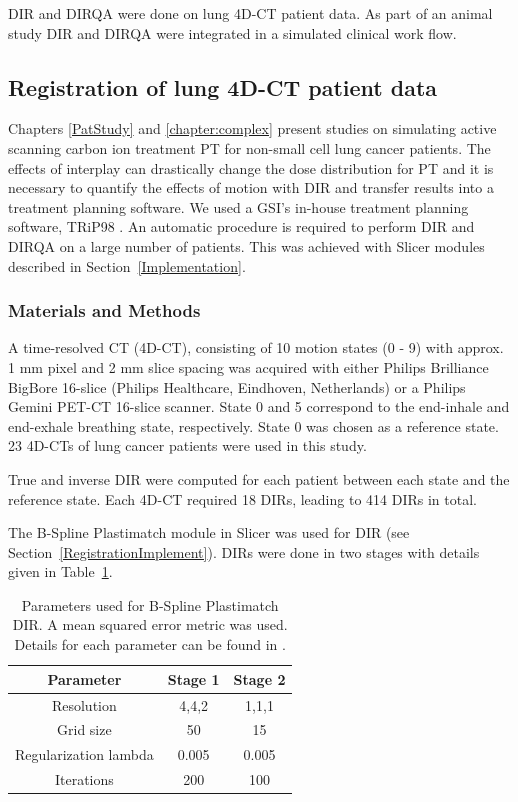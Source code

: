 \documentclass[type=dr, dr=rernat, accentcolor=tud7b,colorbacktitle, bigchapter, openright, twoside, 12pt ]{tudthesis}
\begin{document}
DIR and DIRQA were done on lung 4D-CT patient data. As part of an animal study \cite{Lehmann2015} DIR and DIRQA were integrated in a simulated clinical work flow. 

\subsection{Registration of lung 4D-CT patient data}
\label{lungDIR}

Chapters \ref{PatStudy} and \ref{chapter:complex} present studies on simulating active scanning carbon ion treatment PT for non-small cell lung cancer patients. The effects of interplay can drastically change the dose distribution for PT and it is necessary to quantify the effects of motion with DIR and transfer results into a treatment planning software. We used a GSI's in-house treatment planning software, TRiP98 \cite{Kraemer2000a, Richter2013}. An automatic procedure is required to perform DIR and DIRQA on a large number of patients. This was achieved with Slicer modules described in Section~\ref{Implementation}.

\subsubsection{Materials and Methods}

A time-resolved CT (4D-CT), consisting of 10 motion states (0 - 9) with approx. 1 mm pixel and 2 mm slice spacing was acquired with either Philips Brilliance BigBore 16-slice 
(Philips Healthcare, Eindhoven, Netherlands) or a Philips Gemini PET-CT 16-slice scanner. 
State 0 and 5 correspond to the end-inhale and end-exhale breathing state, respectively. State 0 was chosen as a reference state. 23 4D-CTs of lung cancer patients were used in this study.

True and inverse DIR were computed for each patient between each state and the reference state. Each 4D-CT required 18 DIRs, leading to 414 DIRs in total.

The B-Spline Plastimatch module in Slicer was used for DIR (see Section~\ref{RegistrationImplement}). DIRs were done in two stages with details given in Table~\ref{tab:stages}. 

\begin{table}[H]
  \centering
  \caption{Parameters used for B-Spline Plastimatch DIR. A mean squared error metric was used. Details for each parameter can be found in \cite{Plastimatch}.}
  \begin{tabular}{c|c|c}
      Parameter & Stage 1 & Stage 2 \\
      \hline
      Resolution & 4,4,2 & 1,1,1 \\
      Grid size & 50 & 15 \\
      Regularization lambda & 0.005 & 0.005 \\
      Iterations & 200 & 100 \\
    \hline\hline
  \end{tabular}
  \label{tab:stages}
\end{table}
\end{document}
